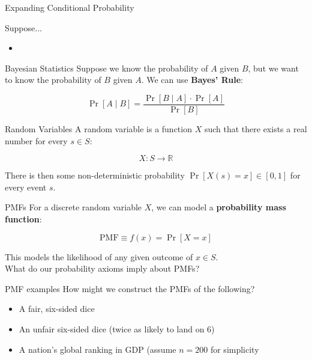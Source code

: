\documentclass[10pt]{beamer}
\begin{document}
\begin{frame}{Expanding Conditional Probability}
    
\end{frame}

\begin{frame}{Suppose...}
    \begin{itemize}
        \item 
    \end{itemize}
\end{frame}


\begin{frame}{Bayesian Statistics}
    Suppose we know the probability of $A$ given $B$, but we want to know the probability of $B$ given $A$. We can use \textbf{Bayes' Rule}:

    \[\Pr[A \; | \; B] = \frac{\Pr[B \; | \; A] \cdot \Pr[A]}{\Pr[B]}\]
\end{frame}

\begin{frame}{Random Variables}
    A random variable is a function $X$ such that there exists a real number for every $s \in S$:

    \[X: S \rightarrow \mathbb{R}\]

    There is then some non-deterministic probability $\Pr[X(s) = x] \in [0, 1]$ for every event $s$.
\end{frame}

\begin{frame}{PMFs}
    For a discrete random variable $X$, we can model a \textbf{probability mass function}:

    \[\text{PMF} \equiv f(x) = \Pr[X = x]\]

    This models the likelihood of any given outcome of $x \in S$. \\

    \vspace{.5cm}
    What do our probability axioms imply about PMFs?
\end{frame}

\begin{frame}{PMF examples}
    How might we construct the PMFs of the following?

    \begin{itemize}
        \item A fair, six-sided dice
        \item An unfair six-sided dice (twice as likely to land on 6)
        \item A nation's global ranking in GDP (assume $n = 200$ for simplicity
    \end{itemize}
\end{frame}
\end{document}
